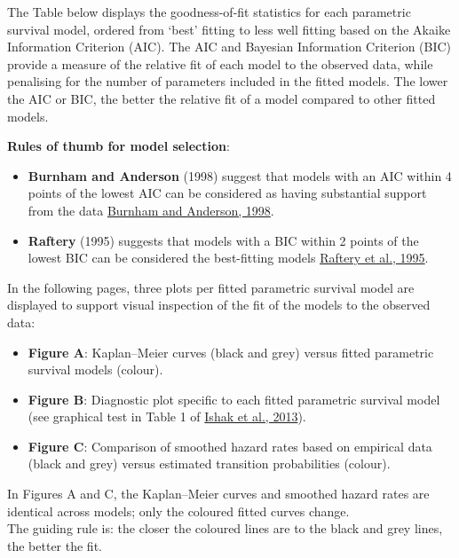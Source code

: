 \documentclass[
]{article}
\providecommand{\tightlist}{%
  \setlength{\itemsep}{0pt}\setlength{\parskip}{0pt}}
\begin{document}
The Table below displays the goodness-of-fit statistics for each
parametric survival model, ordered from `best' fitting to less well
fitting based on the Akaike Information Criterion (AIC). The AIC and
Bayesian Information Criterion (BIC) provide a measure of the relative
fit of each model to the observed data, while penalising for the number
of parameters included in the fitted models. The lower the AIC or BIC,
the better the relative fit of a model compared to other fitted models.

\textbf{Rules of thumb for model selection}:

\begin{itemize}
\tightlist
\item
  \textbf{Burnham and Anderson} (1998) suggest that models with an AIC
  within 4 points of the lowest AIC can be considered as having
  substantial support from the data
  \href{https://doi.org/10.1007/978-1-4757-2917-7}{Burnham and Anderson,
  1998}.\\
\item
  \textbf{Raftery} (1995) suggests that models with a BIC within 2
  points of the lowest BIC can be considered the best-fitting models
  \href{https://doi.org/10.2307/271063}{Raftery et al., 1995}.
\end{itemize}

In the following pages, three plots per fitted parametric survival model
are displayed to support visual inspection of the fit of the models to
the observed data:

\begin{itemize}
\tightlist
\item
  \textbf{Figure A}: Kaplan--Meier curves (black and grey) versus fitted
  parametric survival models (colour).\\
\item
  \textbf{Figure B}: Diagnostic plot specific to each fitted parametric
  survival model (see graphical test in Table 1 of
  \href{https://doi.org/10.1007/s40273-013-0064-3}{Ishak et al., 2013}).
\item
  \textbf{Figure C}: Comparison of smoothed hazard rates based on
  empirical data (black and grey) versus estimated transition
  probabilities (colour).
\end{itemize}

In Figures A and C, the Kaplan--Meier curves and smoothed hazard rates
are identical across models; only the coloured fitted curves change.\\
The guiding rule is: the closer the coloured lines are to the black and
grey lines, the better the fit.
\end{document}
